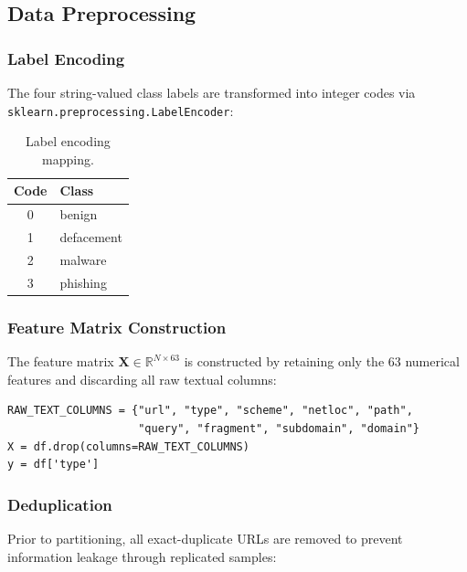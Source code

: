 \documentclass[a4paper,12pt]{article}
\begin{document}
\subsection{Data Preprocessing}

\subsubsection{Label Encoding}

The four string-valued class labels are transformed into integer codes via \texttt{sklearn.preprocessing.LabelEncoder}:

\begin{table}[H]
\centering
\caption{Label encoding mapping.}
\begin{tabular}{cl}
\toprule
\textbf{Code} & \textbf{Class} \\
\midrule
0 & benign \\
1 & defacement \\
2 & malware \\
3 & phishing \\
\bottomrule
\end{tabular}
\end{table}

\subsubsection{Feature Matrix Construction}

The feature matrix $\mathbf{X} \in \mathbb{R}^{N \times 63}$ is constructed by retaining only the 63 numerical features and discarding all raw textual columns:

\begin{lstlisting}[caption={Feature matrix construction}]
RAW_TEXT_COLUMNS = {"url", "type", "scheme", "netloc", "path",
                    "query", "fragment", "subdomain", "domain"}
X = df.drop(columns=RAW_TEXT_COLUMNS)
y = df['type']
\end{lstlisting}

\subsubsection{Deduplication}

Prior to partitioning, all exact-duplicate URLs are removed to prevent information leakage through replicated samples:
\end{document}
